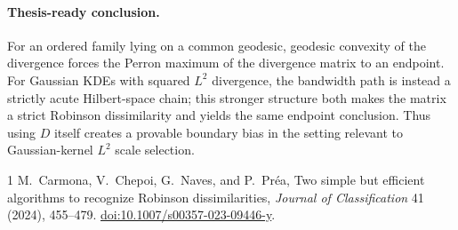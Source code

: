 \documentclass[11pt,a4paper]{article}
\theoremstyle{clean}
\theoremstyle{remark}
\begin{document}
\paragraph{Thesis-ready conclusion.}
For an ordered family lying on a common geodesic, geodesic convexity of the
divergence forces the Perron maximum of the divergence matrix to an endpoint.
For Gaussian KDEs with squared $L^2$ divergence, the bandwidth path is instead
a strictly acute Hilbert-space chain; this stronger structure both makes the
matrix a strict Robinson dissimilarity and yields the same endpoint conclusion.
Thus using $D$ itself creates a provable boundary bias in the setting relevant
to Gaussian-kernel $L^2$ scale selection.

\begin{thebibliography}{1}
M.~Carmona, V.~Chepoi, G.~Naves, and P.~Pr\'ea,
\newblock Two simple but efficient algorithms to recognize Robinson
dissimilarities,
\newblock \emph{Journal of Classification} 41 (2024), 455--479.
\newblock \href{https://doi.org/10.1007/s00357-023-09446-y}
{doi:10.1007/s00357-023-09446-y}.
\end{thebibliography}
\end{document}
